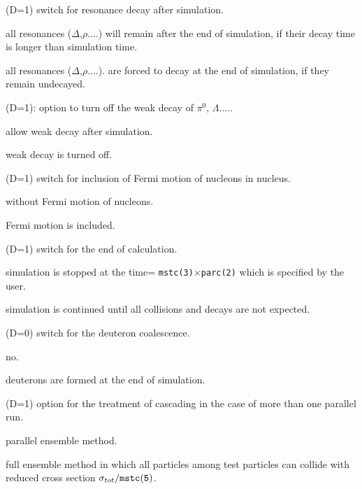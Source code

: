 \documentclass[]{article}
\newenvironment{entry}%
{\begin{list}{}{\setlength{\topsep}{0mm} \setlength{\itemsep}{0mm}
\setlength{\parskip}{0mm} \setlength{\parsep}{0mm}
\setlength{\leftmargin}{20mm} \setlength{\rightmargin}{0mm}
\setlength{\labelwidth}{18mm} \setlength{\labelsep}{2mm}}}%
{\end{list}}
\newenvironment{subentry}%
{\begin{list}{}{\setlength{\topsep}{0mm} \setlength{\itemsep}{0mm}
\setlength{\parskip}{0mm} \setlength{\parsep}{0mm}
\setlength{\leftmargin}{10mm} \setlength{\rightmargin}{0mm}
\setlength{\labelwidth}{18mm} \setlength{\labelsep}{2mm}}}%
{\end{list}}
\newcommand{\ttt}[1]{{\tt#1}}
\newcommand{\itemt}[1]{\item[{\tt #1}\hfill]}
\begin{document}
\begin{entry}
\medskip

\itemt{mstc(41)  :} (D=1) switch for resonance decay after simulation.
  \begin{subentry}
    \itemt{$=0$} all resonances ($\Delta$,$\rho$....) will remain
                 after the end of simulation,
                 if their decay time is longer than simulation time.
    \itemt{$=1$} all resonances ($\Delta$,$\rho$....).
                 are forced to decay at the end of simulation,
                 if they remain undecayed.
    \end{subentry}

\itemt{mstc(42)  :} (D=1): option to turn off the weak decay of $\pi^0$,
 $\Lambda$.....
    \begin{subentry}
        \itemt{$=0$:} allow weak decay after simulation.
        \itemt{$=1$:} weak decay is turned off.
    \end{subentry}
\itemt{mstc(43)  :} (D=1) switch for inclusion of Fermi motion of nucleons
                    in nucleus.
    \begin{subentry}
       \itemt{$=0$ :} without Fermi motion of nucleons.
       \itemt{$=1$ :} Fermi motion is included.
    \end{subentry}

\itemt{mstc(44)  :} (D=1) switch for the end of calculation.
    \begin{subentry}
       \itemt{$=1$ :} simulation is stopped at the time=
         \ttt{mstc(3)$\times$parc(2)} which is
         specified by the user.
       \itemt{$=2$ :}  simulation is continued until all collisions
        and decays are not expected.
    \end{subentry}

\itemt{mstc(45)  :} (D=0) switch for the deuteron coalescence.
    \begin{subentry}
       \itemt{$=0$ :} no.
       \itemt{$=1$ :} deuterons are formed at the end of simulation.
    \end{subentry}

\itemt{mstc(46)  :} (D=1) option for the treatment of cascading 
   in the case of more than one parallel run.
    \begin{subentry}
       \itemt{$=1$ :} parallel ensemble method.
       \itemt{$=2$ :} full ensemble method in which all particles
                      among test particles can collide
                      with reduced cross section
                      $\sigma_{tot}/\tt{mstc(5)}$.
    \end{subentry}



\end{entry}
\end{document}
